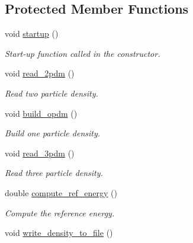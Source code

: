 \subsection*{Protected Member Functions}
\begin{DoxyCompactItemize}
\item 
void \mbox{\hyperlink{classforte_1_1_v2_r_d_m_ad6fcf6910a6b1534417029d000818ba0}{startup}} ()
\begin{DoxyCompactList}\small\item\em Start-\/up function called in the constructor. \end{DoxyCompactList}\item 
void \mbox{\hyperlink{classforte_1_1_v2_r_d_m_aa0e30e636b46a2eb47824737938b4e17}{read\+\_\+2pdm}} ()
\begin{DoxyCompactList}\small\item\em Read two particle density. \end{DoxyCompactList}\item 
void \mbox{\hyperlink{classforte_1_1_v2_r_d_m_a01d1d5bd31ed66b33d4a471b7412bfb3}{build\+\_\+opdm}} ()
\begin{DoxyCompactList}\small\item\em Build one particle density. \end{DoxyCompactList}\item 
void \mbox{\hyperlink{classforte_1_1_v2_r_d_m_a5689f0ed416de34110ff6db161d00eac}{read\+\_\+3pdm}} ()
\begin{DoxyCompactList}\small\item\em Read three particle density. \end{DoxyCompactList}\item 
double \mbox{\hyperlink{classforte_1_1_v2_r_d_m_a96bf97c6ab7c7c76f50cb9aee087e521}{compute\+\_\+ref\+\_\+energy}} ()
\begin{DoxyCompactList}\small\item\em Compute the reference energy. \end{DoxyCompactList}\item 
void \mbox{\hyperlink{classforte_1_1_v2_r_d_m_a76e38b06a06e5f49b8fcc042f86c26d1}{write\+\_\+density\+\_\+to\+\_\+file}} ()
\end{DoxyCompactItemize}
